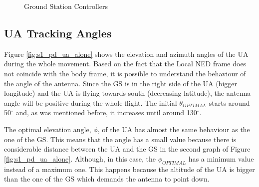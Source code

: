 \begin{figure}[H]
	\hfill
	\caption{Ground Station Controllers}
	\label{fig:s1_gs}
\end{figure}

\subsection*{UA Tracking Angles}
Figure \ref{fig:s1_pd_ua_alone} shows the elevation and azimuth angles of the UA during the whole movement. Based on the fact that the Local NED frame does not coincide with the body frame, it is possible to understand the behaviour of the angle of the antenna. Since the GS is in the right side of the UA (bigger longitude) and the UA is flying towards south (decreasing latitude), the antenna angle will be positive during the whole flight.
The initial $\theta_{OPTIMAL}$ starts around 50$^{\circ}$ and, as was mentioned before, it increases until around 130$^{\circ}$.

The optimal elevation angle, $\phi$, of the UA has almost the same behaviour as the one of the GS. This means that the angle has a small value because there is considerable distance between the UA and the GS in the second graph of Figure \ref{fig:s1_pd_ua_alone}. Although, in this case, the $\phi_{OPTIMAL}$ has a minimum value instead of a maximum one. This happens because the altitude of the UA is bigger than the one of the GS which demands the antenna to point down.


